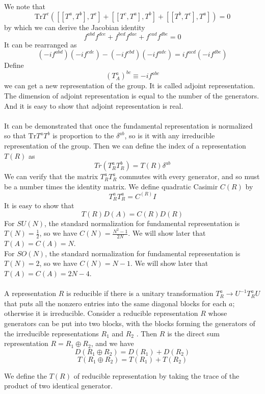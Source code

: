 \noindent
We note that
\[\mathrm{Tr} T^e\left([[T^a,T^b],T^c] + [[T^c,T^a],T^b] + [[T^b,T^c],T^a] \right) = 0\]
by which we can derive the Jacobian identity
\[f^{abd}f^{dce} + f^{bcd}f^{dae} + f^{cad}f^{dbe} = 0\]
It can be rearranged as 
\[(-if^{abd})(-if^{cde})-(-if^{cbd})(-if^{ade}) = if^{acd} (-if^{dbe})\]
Define
\[(T^a_{A})^{bc} \equiv -if^{abc}\]
we can get a new representation of the group. It is called adjoint representation. The dimension of adjoint representation is equal to the number of the generators. And it is easy to show that adjoint representation is real.
\\ \\
It can be demonstrated that once the fundamental representation is normalized so that $\mathrm{Tr}T^aT^b$ is proportion to the $\delta^{ab}$, so is it with any irreducible representation of the group. Then we can define the index of a representation $T(R)$ as
\[Tr(T^a_R T^b_R) = T(R)\delta^{ab}\]
We can verify that the matrix $T^a_R T^a_R$ commutes with
every generator, and so must be a number times the identity matrix. We define quadratic Casimir $C(R)$ by
\[T^a_R T^a_R = C^(R)I\]
It is easy to show that
\[T(R)D(A) = C(R)D(R)\]
For $SU(N)$, the standard normalization for fundamental representation is $T(N) = \frac{1}{2}$, so we have $C(N) = \frac{N^2-1}{2N}$. We will show later that $T(A) = C(A) = N$. \\
For $SO(N)$, the standard normalization for fundamental representation is $T(N) = 2$, so we have $C(N) = N-1$. We will show later that $T(A) = C(A) = 2N-4$.
\\ \\
A representation $R$ is reducible if there is a unitary transformation $T^a_R \to U^{-1}T^a_RU$ that puts all the nonzero entries into the same diagonal blocks
for each $a$; otherwise it is irreducible. 
Consider a reducible representation $R$ whose generators can be put into two blocks, with the blocks forming the generators of the irreducible representations $R_1$ and $R_2$ . Then $R$ is the direct sum representation $R = R_1\oplus R_2$, and we have
\[D(R_1\oplus R_2) = D(R_1) + D(R_2)\]
\[T(R_1\oplus R_2) = T(R_1) + T(R_2)\]
\begin{note}
We define the $T(R)$ of reducible representation by taking the trace of the product of two identical generator.
\end{note}

